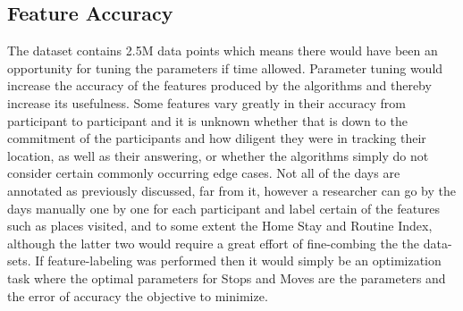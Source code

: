 \subsection{Feature Accuracy}
The dataset contains 2.5M data points which means there would have been an opportunity for tuning the parameters if time allowed. Parameter tuning would increase the accuracy of the features produced by the algorithms and thereby increase its usefulness. Some features vary greatly in their accuracy from participant to participant and it is unknown whether that is down to the commitment of the participants and how diligent they were in tracking their location, as well as their answering, or whether the algorithms simply do not consider certain commonly occurring edge cases. Not all of the days are annotated as previously discussed, far from it, however a researcher can go by the days manually one by one for each participant and label certain of the features such as places visited, and to some extent the Home Stay and Routine Index, although the latter two would require a great effort of fine-combing the the data-sets. If feature-labeling was performed then it would simply be an optimization task where the optimal parameters for Stops and Moves are the parameters and the error of accuracy the objective to minimize. 
